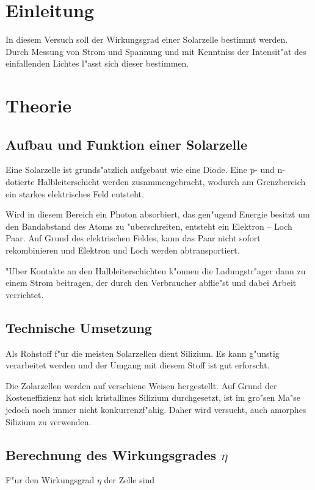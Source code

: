 \section{Einleitung}
	\label{sec:einleitung}
	In diesem Versuch soll der Wirkungsgrad einer Solarzelle bestimmt werden.
	Durch Messung von Strom und Spannung und mit Kenntniss der Intensit"at des einfallenden Lichtes l"asst sich dieser bestimmen.


\section{Theorie}
	\label{sec:theorie}

	\subsection{Aufbau und Funktion einer Solarzelle}
		\label{subsec:aufbau_funktion}
		Eine Solarzelle ist grunds"atzlich aufgebaut wie eine Diode.
		Eine p- und n-dotierte Halbleiterschicht werden zusammengebracht, wodurch am Grenzbereich ein starkes elektrisches Feld entsteht.

		Wird in diesem Bereich ein Photon absorbiert, das gen"ugend Energie besitzt um den Bandabstand des Atoms zu "uberschreiten, entsteht ein Elektron -- Loch Paar.
		Auf Grund des elektrischen Feldes, kann das Paar nicht sofort rekombinieren und Elektron und Loch werden abtransportiert.

		"Uber Kontakte an den Halbleiterschichten k"onnen die Ladungstr"ager dann zu einem Strom beitragen, der durch den Verbraucher abflie"st und dabei Arbeit verrichtet.

	\subsection{Technische Umsetzung}
		\label{sub:umsetzung}
		Als Rohstoff f"ur die meisten Solarzellen dient Silizium.
		Es kann g"unstig verarbeitet werden und der Umgang mit diesem Stoff ist gut erforscht.

		Die Zolarzellen werden auf verschiene Weisen hergestellt.
		Auf Grund der Kosteneffizienz hat sich kristallines Silizium durchgesetzt, ist im gro"sen Ma"se jedoch noch immer nicht konkurrenzf"ahig.
		Daher wird versucht, auch amorphes Silizium zu verwenden.

		

	\subsection{Berechnung des Wirkungsgrades $\eta$}
		\label{subsec:wirkungsgrad}
		F"ur den Wirkungsgrad $\eta$ der Zelle sind 
